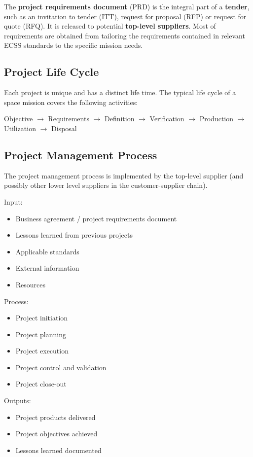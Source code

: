 The \textbf{project requirements document} (PRD) is the integral part of a \textbf{tender}, such as an invitation to tender (ITT), request for proposal (RFP) or request for quote (RFQ). It is released to potential \textbf{top-level suppliers}. Most of requirements are obtained from tailoring the requirements contained in relevant ECSS standards to the specific mission needs. 

\subsection{Project Life Cycle}

Each project is unique and has a distinct life time. The typical life cycle of a space mission covers the following activities:

Objective 
$\rightarrow$ Requirements
$\rightarrow$ Definition
$\rightarrow$ Verification
$\rightarrow$ Production
$\rightarrow$ Utilization
$\rightarrow$ Disposal

\subsection{Project Management Process}

The project management process is implemented by the top-level supplier (and possibly other lower level suppliers in the customer-supplier chain).

Input: 
\begin{itemize}
\item Business agreement / project requirements document
\item Lessons learned from previous projects
\item Applicable standards
\item External information
\item Resources 
\end{itemize}

Process:
\begin{itemize}
\item Project initiation
\item Project planning
\item Project execution
\item Project control and validation
\item Project close-out
\end{itemize}

Outputs:
\begin{itemize}
\item Project products delivered
\item Project objectives achieved 
\item Lessons learned documented
\end{itemize}

